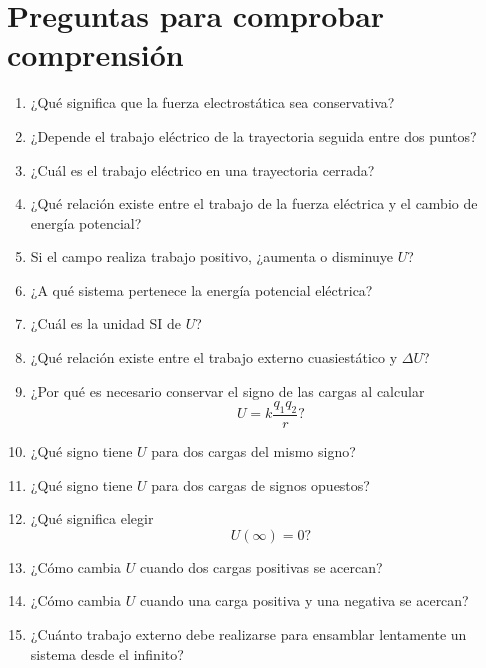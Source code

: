 \section{Preguntas para comprobar comprensión}

\begin{enumerate}
    \item ¿Qué significa que la fuerza electrostática sea conservativa?

    \item ¿Depende el trabajo eléctrico de la trayectoria seguida entre dos puntos?

    \item ¿Cuál es el trabajo eléctrico en una trayectoria cerrada?

    \item ¿Qué relación existe entre el trabajo de la fuerza eléctrica y el cambio de
    energía potencial?

    \item Si el campo realiza trabajo positivo, ¿aumenta o disminuye \(U\)?

    \item ¿A qué sistema pertenece la energía potencial eléctrica?

    \item ¿Cuál es la unidad SI de \(U\)?

    \item ¿Qué relación existe entre el trabajo externo cuasiestático y \(\Delta U\)?

    \item ¿Por qué es necesario conservar el signo de las cargas al calcular
    \[
    U=k\frac{q_1q_2}{r}?
    \]

    \item ¿Qué signo tiene \(U\) para dos cargas del mismo signo?

    \item ¿Qué signo tiene \(U\) para dos cargas de signos opuestos?

    \item ¿Qué significa elegir
    \[
    U(\infty)=0?
    \]

    \item ¿Cómo cambia \(U\) cuando dos cargas positivas se acercan?

    \item ¿Cómo cambia \(U\) cuando una carga positiva y una negativa se acercan?

    \item ¿Cuánto trabajo externo debe realizarse para ensamblar lentamente un sistema
    desde el infinito?


\end{enumerate}
